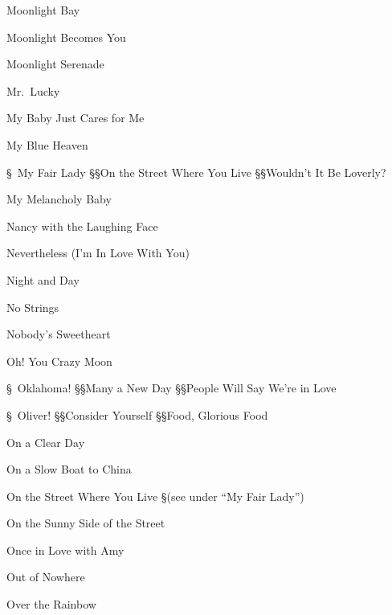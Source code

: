 \N Moonlight Bay

\N Moonlight Becomes You

\N Moonlight Serenade

\N Mr.~Lucky

\N My Baby Just Cares for Me

\N My Blue Heaven

\S\ My Fair Lady
\S\S On the Street Where You Live
\S\S Wouldn't It Be Loverly?

\N My Melancholy Baby

\N Nancy with the Laughing Face

\N Nevertheless (I'm In Love With You)

\N Night and Day

\N No Strings

\N Nobody's Sweetheart

\N Oh! You Crazy Moon

\S\ Oklahoma!
\S\S Many a New Day
\S\S People Will Say We're in Love

\S\ Oliver!
\S\S Consider Yourself
\S\S Food, Glorious Food

\N On a Clear Day

\N On a Slow Boat to China

\N On the Street Where You Live
\nobreak
\S (see under ``My Fair Lady'')

\N On the Sunny Side of the Street

\N Once in Love with Amy

\N Out of Nowhere

\N Over the Rainbow

\singlecolumn


\bye

